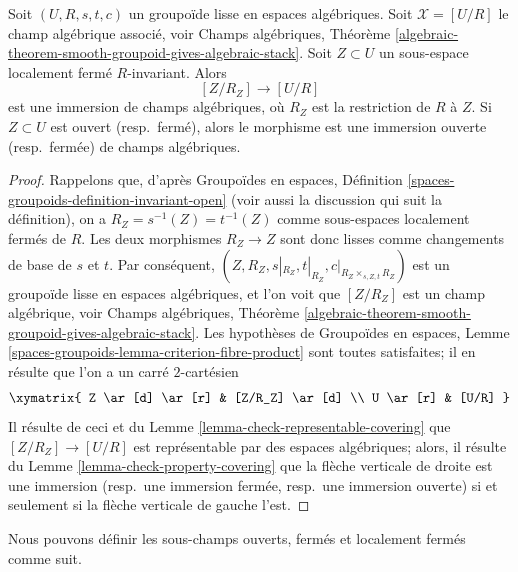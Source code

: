 \begin{lemma}
\label{lemma-immersion-presentation}
Soit $(U, R, s, t, c)$ un groupoïde lisse en espaces algébriques.
Soit $\mathcal{X} = [U/R]$ le champ algébrique associé, voir
Champs algébriques,
Théorème \ref{algebraic-theorem-smooth-groupoid-gives-algebraic-stack}.
Soit $Z \subset U$ un sous-espace localement fermé $R$-invariant. Alors
$$
[Z/R_Z] \longrightarrow [U/R]
$$
est une immersion de champs algébriques, où $R_Z$ est la restriction
de $R$ à $Z$. Si $Z \subset U$ est ouvert (resp.\ fermé), alors le morphisme
est une immersion ouverte (resp.\ fermée) de champs algébriques.
\end{lemma}

\begin{proof}
Rappelons que, d'après
Groupoïdes en espaces,
Définition \ref{spaces-groupoids-definition-invariant-open}
(voir aussi la discussion qui suit la définition),
on a $R_Z = s^{-1}(Z) = t^{-1}(Z)$ comme sous-espaces localement fermés
de $R$. Les deux morphismes $R_Z \to Z$ sont donc lisses comme changements de base
de $s$ et $t$. Par conséquent,
$(Z, R_Z, s|_{R_Z}, t|_{R_Z}, c|_{R_Z \times_{s, Z, t} R_Z})$ est
un groupoïde lisse en espaces algébriques, et l'on voit que
$[Z/R_Z]$ est un champ algébrique, voir
Champs algébriques,
Théorème \ref{algebraic-theorem-smooth-groupoid-gives-algebraic-stack}.
Les hypothèses de
Groupoïdes en espaces,
Lemme \ref{spaces-groupoids-lemma-criterion-fibre-product}
sont toutes satisfaites; il en résulte que l'on a un carré $2$-cartésien
$$
\xymatrix{
Z \ar[d] \ar[r] & [Z/R_Z] \ar[d] \\
U \ar[r] & [U/R]
}
$$
Il résulte de ceci et du
Lemme \ref{lemma-check-representable-covering}
que $[Z/R_Z] \to [U/R]$ est représentable par des espaces algébriques;
alors, il résulte du
Lemme \ref{lemma-check-property-covering}
que la flèche verticale de droite est une immersion (resp.\ une immersion fermée,
resp.\ une immersion ouverte) si et seulement si la flèche verticale de gauche l'est.
\end{proof}

\noindent
Nous pouvons définir les sous-champs ouverts, fermés et localement fermés comme suit.

